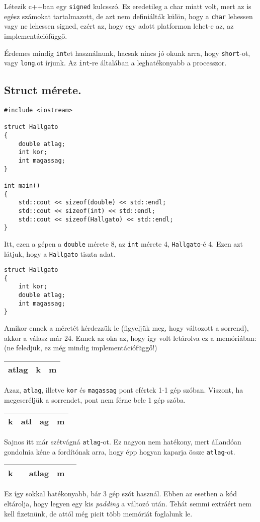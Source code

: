 \documentclass[a4paper,11.5pt]{article}
\begin{document}
	Létezik c++ban egy \texttt{signed} kulcsszó. Ez eredetileg a char miatt volt, mert az is egész számokat tartalmazott, de azt nem definiálták külön, hogy a \texttt{char} lehessen vagy ne lehessen signed, ezért az, hogy egy adott platformon lehet-e az, az implementációfüggő.
	\begin{note}
		Érdemes mindig \texttt{int}et használnunk, hacsak nincs jó okunk arra, hogy \texttt{short}-ot, vagy \texttt{long}.ot írjunk. Az \texttt{int}-re általában a leghatékonyabb a processzor.
	\end{note}
	\subsection{Struct mérete.}
	\begin{lstlisting}
#include <iostream>

struct Hallgato
{
	double atlag;
	int kor;
	int magassag;
}

int main()
{
	std::cout << sizeof(double) << std::endl;
	std::cout << sizeof(int) << std::endl;
	std::cout << sizeof(Hallgato) << std::endl;
}
	\end{lstlisting}
	Itt, ezen a gépen a \texttt{double} mérete 8, az \texttt{int} mérete 4, \texttt{Hallgato}-é 4. Ezen azt látjuk, hogy a \texttt{Hallgato} tiszta adat.
	\begin{lstlisting}
struct Hallgato
{
	int kor;
	double atlag;
	int magassag;
}
	\end{lstlisting} 
	Amikor ennek a méretét kérdezzük le (figyeljük meg, hogy változott a sorrend), akkor a válasz már 24. Ennek az oka az, hogy így volt letárolva ez a memóriában: (ne feledjük, ez még mindig implementációfüggő!)
	\begin{center}
		\begin{tabular}{|c||c|c|}
			\hline
			atlag&k&m\\
			\hline
		\end{tabular}
	\end{center}
	Azaz, \texttt{atlag}, illetve \texttt{kor} és \texttt{magassag} pont efértek 1-1 gép szóban. Viszont, ha megcseréljük a sorrendet, pont nem férne bele 1 gép szóba.
	\begin{center}
		\begin{tabular}{|c|c||c|c|}
			\hline
			k&atl&ag&m\\
			\hline
		\end{tabular}
	\end{center}
	Sajnos itt már szétvágná \texttt{atlag}-ot. Ez nagyon nem hatékony, mert állandóan gondolnia kéne a fordítónak arra, hogy épp hogyan kaparja össze \texttt{atlag}-ot.
	\begin{center}
		\begin{tabular}{|c|c||c||c|c|}
			\hline
			k&\quad &atlag&m&\quad \\
			\hline
		\end{tabular}
	\end{center}
	Ez így sokkal hatékonyabb, bár 3 gép szót használ. Ebben az esetben a kód eltárolja, hogy legyen egy kis \textit{padding } a változó után. Tehát semmi extráért nem kell fizetnünk, de attól még picit több memóriát foglalunk le.
	
\end{document}
